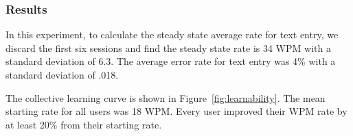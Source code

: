 \begin{comment}
  \caption{We ask the user to evaluate the performance, design, ergonomics and applicability of Slide on a 5-point Likert Scale (Strongly Disagree, Disagree, neutral, Agree, Strongly Agree).}
  
  \label{table:usability}

\end{figure}


\subsubsection{Subjective }
we ask the user to evaluate each entry mechanism on a 5-point Likert Scale (Strongly Disagree, Disagree, neutral, Agree, Strongly Agree).
Additionally, users are  interviewed to further understand the their qualitative experience.
\end{comment}


\subsubsection{Results}
In this experiment, to calculate the steady state average rate for text entry, we discard the first six sessions and find the steady state rate is 34 WPM with a standard deviation of 6.3. The average error rate for text entry was 4\% with a standard deviation of .018.

The collective learning curve is shown in Figure~\ref{fig:learnability}.
The mean starting rate for all users was 18 WPM.
Every user improved their WPM rate by at least 20\% from their starting rate.


